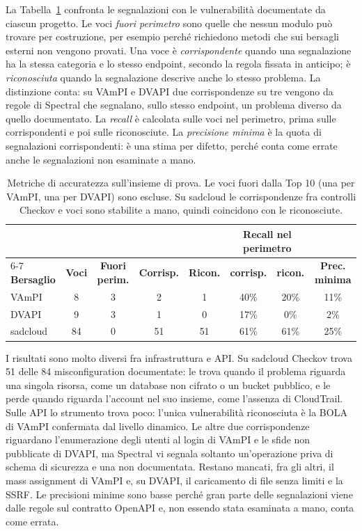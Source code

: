 La Tabella~\ref{tab:ris-metriche} confronta le segnalazioni con le
vulnerabilità documentate da ciascun progetto. Le voci \emph{fuori perimetro}
sono quelle che nessun modulo può trovare per costruzione, per esempio perché
richiedono metodi che sui bersagli esterni non vengono provati. Una voce è
\emph{corrispondente} quando una segnalazione ha la stessa categoria e lo
stesso endpoint, secondo la regola fissata in anticipo; è \emph{riconosciuta}
quando la segnalazione descrive anche lo stesso problema. La distinzione
conta: su VAmPI e DVAPI due corrispondenze su tre vengono da regole di Spectral
che segnalano, sullo stesso endpoint, un problema diverso da quello
documentato. La \emph{recall} è calcolata sulle voci nel perimetro, prima sulle
corrispondenti e poi sulle riconosciute. La \emph{precisione minima} è la quota
di segnalazioni corrispondenti: è una stima per difetto, perché conta come
errate anche le segnalazioni non esaminate a mano.

\begin{table}[htbp]
  \centering
  \small
  \linespread{1.0}\selectfont
  \setlength{\tabcolsep}{5pt}
  \begin{tabular}{@{}lccccccc@{}}
    \toprule
    & & & & & \multicolumn{2}{c}{\textbf{Recall nel perimetro}} & \\
    \cmidrule(lr){6-7}
    \textbf{Bersaglio} & \textbf{Voci} & \textbf{Fuori perim.} & \textbf{Corrisp.} & \textbf{Ricon.} & \textbf{corrisp.} & \textbf{ricon.} & \textbf{Prec. minima} \\
    \midrule
    VAmPI & 8 & 3 & 2 & 1 & 40\% & 20\% & 11\% \\
    DVAPI & 9 & 3 & 1 & 0 & 17\% & 0\% & 2\% \\
    sadcloud & 84 & 0 & 51 & 51 & 61\% & 61\% & 25\% \\
    \bottomrule
  \end{tabular}
  \caption[Metriche di accuratezza sull'insieme di prova]{Metriche di
    accuratezza sull'insieme di prova. Le voci fuori dalla Top 10 (una per VAmPI,
    una per DVAPI) sono escluse. Su sadcloud le corrispondenze fra controlli
  Checkov e voci sono stabilite a mano, quindi coincidono con le riconosciute.}
  \label{tab:ris-metriche}
\end{table}

I risultati sono molto diversi fra infrastruttura e API. Su sadcloud Checkov
trova 51 delle 84 misconfiguration documentate: le trova quando il problema
riguarda una singola risorsa, come un database non cifrato o un bucket
pubblico, e le perde quando riguarda l'account nel suo insieme, come l'assenza
di CloudTrail. Sulle API lo strumento trova poco: l'unica vulnerabilità
riconosciuta è la BOLA di VAmPI confermata dal livello dinamico. Le altre due
corrispondenze riguardano l'enumerazione degli utenti al login di VAmPI e le
sfide non pubblicate di DVAPI, ma Spectral vi segnala soltanto un'operazione
priva di schema di sicurezza e una non documentata. Restano mancati, fra
gli altri, il mass assignment di VAmPI e, su DVAPI, il caricamento di file
senza limiti e la SSRF. Le precisioni minime sono basse perché gran parte
delle segnalazioni viene dalle regole sul contratto OpenAPI e, non essendo
stata esaminata a mano, conta come errata.

